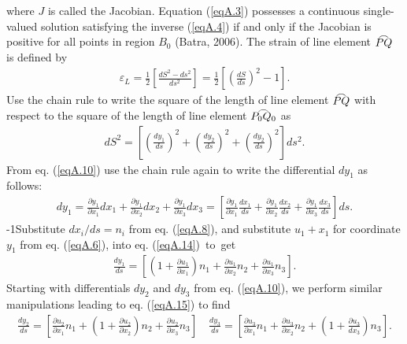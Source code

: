 \documentclass{AeroStructure-ERJohnson}
\def\tfrown#1{\overset{\smash{\lower3pt\hbox{$\frown$}}}{#1}}
\begin{document}
where $J$ is called the Jacobian. Equation (\ref{eqA.3}) possesses a continuous single-valued solution satisfying the inverse (\ref{eqA.4}) if and only if the Jacobian is positive for all points in region $B_{0}$ (Batra, 2006). The strain of line element $\tfrown{PQ}$ is defined by
\begin{align}\label{eqA.12}
\varepsilon_{L}=\frac{1}{2}\left[\frac{d S^{2}-d s^{2}}{d s^{2}}\right]=\frac{1}{2}\left[\left(\frac{d S}{d s}\right)^{2}-1\right].
\end{align}
Use the chain rule to write the square of the length of line element $\tfrown{PQ}$ with respect to the square of the length of   line element $\tfrown{P_{0} Q_{0}}$ as
\begin{align}\label{eqA.13}
d S^{2}=\left[\left(\frac{d y_{1}}{d s}\right)^{2}+\left(\frac{d y_{2}}{d s}\right)^{2}+\left(\frac{d y_{2}}{d s}\right)^{2}\right] d s^{2}.
\end{align}
From eq. (\ref{eqA.10}) use the chain rule again to write the differential $ d y_{1} $ as follows:
\begin{align}\label{eqA.14}
d y_{1}=\frac{\partial y_{1}}{\partial x_{1}} d x_{1}+\frac{\partial y_{1}}{\partial x_{2}} d x_{2}+\frac{\partial y_{1}}{\partial x_{3}} d x_{3}=\left[\frac{\partial y_{1}}{\partial x_{1}} \frac{d x_{1}}{d s}+\frac{\partial y_{1}}{\partial x_{2}} \frac{d x_{2}}{d s}+\frac{\partial y_{1}}{\partial x_{3}} \frac{d x_{3}}{d s}\right] d s.
\end{align}
\looseness-1Substitute $d x_{i} / d s=n_{i}$ from eq. (\ref{eqA.8}), and substitute $u_{1}+x_{1}$ for coordinate $y_{1}$ from eq. (\ref{eqA.6}), into eq. (\ref{eqA.14})~to~get
\begin{align}\label{eqA.15}
\frac{d y_{1}}{d s}=\left[\left(1+\frac{\partial u_{1}}{\partial x_{1}}\right) n_{1}+\frac{\partial u_{1}}{\partial x_{2}} n_{2}+\frac{\partial u_{1}}{\partial x_{3}} n_{3}\right].
\end{align}
Starting with differentials $d y_{2}$ and $d y_{3}$ from eq. (\ref{eqA.10}), we perform similar manipulations leading to eq. (\ref{eqA.15}) to find
\begin{align}\label{eqA.16}
\frac{d y_{2}}{d s}=\left[\frac{\partial u_{2}}{\partial x_{1}} n_{1}+\left(1+\frac{\partial u_{2}}{\partial x_{2}}\right) n_{2}+\frac{\partial u_{2}}{\partial x_{3}} n_{3}\right] \quad \frac{d y_{3}}{d s}=\left[\frac{\partial u_{3}}{\partial x_{1}} n_{1}+\frac{\partial u_{3}}{\partial x_{2}} n_{2}+\left(1+\frac{\partial u_{3}}{d x_{3}}\right) n_{3}\right].
\end{align}
\end{document}
